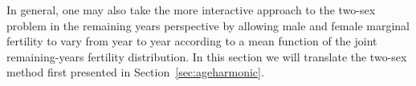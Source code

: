 
In general, one may also take the more interactive approach to the two-sex
problem in the remaining years perspective by allowing male and female marginal
fertility to vary from year to year according to a mean function of the
joint remaining-years fertility distribution. In this section we will translate
the two-sex method first presented in Section~\ref{sec:ageharmonic}.














